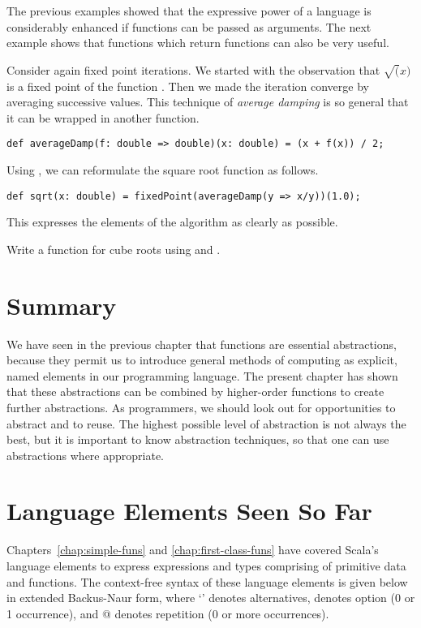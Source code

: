 The previous examples showed that the expressive power of a language
is considerably enhanced if functions can be passed as arguments.  The
next example shows that functions which return functions can also be
very useful.

Consider again fixed point iterations. We started with the observation
that $\sqrt(x)$ is a fixed point of the function .
Then we made the iteration converge by averaging successive values.
This technique of {\em average damping} is so general that it
can be wrapped in another function.
\begin{lstlisting}
def averageDamp(f: double => double)(x: double) = (x + f(x)) / 2;
\end{lstlisting}
Using , we can reformulate the square root function
as follows.
\begin{lstlisting}
def sqrt(x: double) = fixedPoint(averageDamp(y => x/y))(1.0);
\end{lstlisting}
This expresses the elements of the algorithm as clearly as possible.

\begin{exercise} Write a function for cube roots using  and 
.
\end{exercise}

\section{Summary}

We have seen in the previous chapter that functions are essential
abstractions, because they permit us to introduce general methods of
computing as explicit, named elements in our programming language.
The present chapter has shown that these abstractions can be combined
by higher-order functions to create further abstractions.  As
programmers, we should look out for opportunities to abstract and to
reuse. The highest possible level of abstraction is not always the
best, but it is important to know abstraction techniques, so that one
can use abstractions where appropriate.

\section{Language Elements Seen So Far}

Chapters~\ref{chap:simple-funs} and \ref{chap:first-class-funs} have
covered Scala's language elements to express expressions and types
comprising of primitive data and functions.  The context-free syntax
of these language elements is given below in extended Backus-Naur
form, where `\code{|}' denotes alternatives, \code{[...]} denotes
option (0 or 1 occurrence), and @ denotes repetition
(0 or more occurrences).


